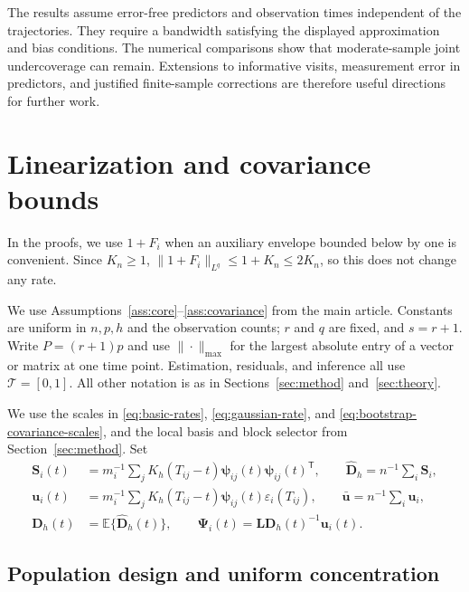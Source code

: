 \documentclass[12pt]{article}
\newcommand{\bu}{{\mathbf u}}
\newcommand{\bD}{{\mathbf D}}
\newcommand{\bL}{{\mathbf L}}
\newcommand{\bS}{{\mathbf S}}
\newcommand{\bpsi} {\boldsymbol{{\mathbf \psi}}}
\newcommand{\bPsi} {\boldsymbol{\Psi}}
\newcommand{\expect}{\mathbb{E}}
\newcommand{\trans}{{\scriptscriptstyle\mathsf{T}}}
\numberwithin{equation}{section}
\begin{document}
The results assume error-free predictors and observation times independent
of the trajectories. They require a bandwidth satisfying the displayed
approximation and bias conditions. The numerical comparisons show that
moderate-sample joint undercoverage can remain. Extensions to informative
visits, measurement error in predictors, and justified finite-sample
corrections are therefore useful directions for further work.


\clearpage
\appendix
{}

\section{Linearization and covariance bounds}
\label{app:hd-linear-covariance}

In the proofs, we use $1+F_i$ when an auxiliary envelope bounded below
by one is convenient. Since $K_n\ge1$,
$\|1+F_i\|_{L^q}\le1+K_n\le2K_n$, so this does not change any rate.

We use Assumptions~\ref{ass:core}--\ref{ass:covariance} from the main
article. Constants are uniform in $n,p,h$ and the observation counts;
$r$ and $q$ are fixed, and $s=r+1$.
Write $P=(r+1)p$ and use $\|\cdot\|_{\max}$ for the largest absolute
entry of a vector or matrix at one time point. Estimation, residuals,
and inference all use $\mathcal T=[0,1]$. All other notation is as in
Sections~\ref{sec:method} and~\ref{sec:theory}.

We use the scales in \eqref{eq:basic-rates},
\eqref{eq:gaussian-rate}, and \eqref{eq:bootstrap-covariance-scales},
and the local basis and block selector from Section~\ref{sec:method}.
Set
\[
\begin{split}
\bS_i(t)&=m_i^{-1}\sum_jK_h(T_{ij}-t)
\bpsi_{ij}(t)\bpsi_{ij}(t)^\trans,\qquad
\widehat{\bD}_h=n^{-1}\sum_i\bS_i,\\
\bu_i(t)&=m_i^{-1}\sum_jK_h(T_{ij}-t)
\bpsi_{ij}(t)\varepsilon_i(T_{ij}),\qquad
\bar\bu=n^{-1}\sum_i\bu_i,\\
\bD_h(t)&=\expect\{\widehat{\bD}_h(t)\},\qquad
\bPsi_i(t)=\bL\bD_h(t)^{-1}\bu_i(t).
\end{split}
\]

\subsection{Population design and uniform concentration}
\end{document}

